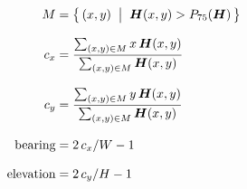 \documentclass[12pt]{article}
\begin{document}
\thispagestyle{empty}

\begin{align}
M &= \bigl\{\,(x,y)\;\bigm|\;\bm{H}(x,y) > P_{75}(\bm{H})\,\bigr\} \\[8pt]
c_x &= \frac{\sum_{(x,y)\in M} x\,\bm{H}(x,y)}{\sum_{(x,y)\in M} \bm{H}(x,y)} \\[8pt]
c_y &= \frac{\sum_{(x,y)\in M} y\,\bm{H}(x,y)}{\sum_{(x,y)\in M} \bm{H}(x,y)} \\[8pt]
\text{bearing} &= 2\,c_x / W - 1 \\[8pt]
\text{elevation} &= 2\,c_y / H - 1
\end{align}
\end{document}
